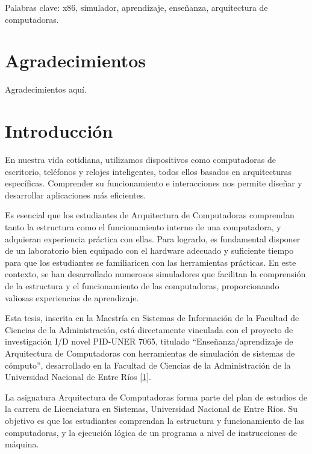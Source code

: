 \documentclass[12pt,oneside]{templates/unerthesis}
\begin{document}
Palabras clave: x86, simulador, aprendizaje, enseñanza, arquitectura de computadoras.

\hypertarget{agradecimientos}{%
\chapter*{Agradecimientos}\label{agradecimientos}}

Agradecimientos aquí.

\hypertarget{intro}{%
\chapter{Introducción}\label{intro}}

En nuestra vida cotidiana, utilizamos dispositivos como computadoras de escritorio, teléfonos y relojes inteligentes, todos ellos basados en arquitecturas específicas. Comprender su funcionamiento e interacciones nos permite diseñar y desarrollar aplicaciones más eficientes.

Es esencial que los estudiantes de Arquitectura de Computadoras comprendan tanto la estructura como el funcionamiento interno de una computadora, y adquieran experiencia práctica con ellas. Para lograrlo, es fundamental disponer de un laboratorio bien equipado con el hardware adecuado y suficiente tiempo para que los estudiantes se familiaricen con las herramientas prácticas. En este contexto, se han desarrollado numerosos simuladores que facilitan la comprensión de la estructura y el funcionamiento de las computadoras, proporcionando valiosas experiencias de aprendizaje.

Esta tesis, inscrita en la Maestría en Sistemas de Información de la Facultad de Ciencias de la Administración, está directamente vinculada con el proyecto de investigación I/D novel PID-UNER 7065, titulado ``Enseñanza/aprendizaje de Arquitectura de Computadoras con herramientas de simulación de sistemas de cómputo'', desarrollado en la Facultad de Ciencias de la Administración de la Universidad Nacional de Entre Ríos \protect\hyperlink{ref-colombani_pid_2022}{{[}1{]}}.

La asignatura Arquitectura de Computadoras forma parte del plan de estudios de la carrera de Licenciatura en Sistemas, Universidad Nacional de Entre Ríos. Su objetivo es que los estudiantes comprendan la estructura y funcionamiento de las computadoras, y la ejecución lógica de un programa a nivel de instrucciones de máquina.
\end{document}
